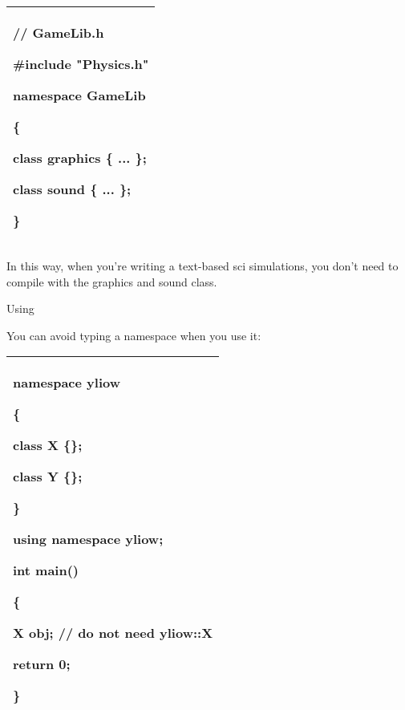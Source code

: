 \documentclass[
]{article}
\begin{document}
\begin{longtable}[]{@{}l@{}}
\toprule
\endhead
\begin{minipage}[t]{0.97\columnwidth}\raggedright
// GameLib.h

\#include "Physics.h"

namespace GameLib

\{

class graphics \{ ... \};

class sound \{ ... \};

\}\strut
\end{minipage}\tabularnewline
\bottomrule
\end{longtable}

In this way, when you're writing a text-based sci simulations, you don't
need to compile with the graphics and sound class.

Using

You can avoid typing a namespace when you use it:

\begin{longtable}[]{@{}l@{}}
\toprule
\endhead
\begin{minipage}[t]{0.97\columnwidth}\raggedright
namespace yliow

\{

class X \{\};

class Y \{\};

\}

using namespace yliow;

int main()

\{

X obj; // do not need yliow::X

return 0;

\}\strut
\end{minipage}\tabularnewline
\bottomrule
\end{longtable}
\end{document}

